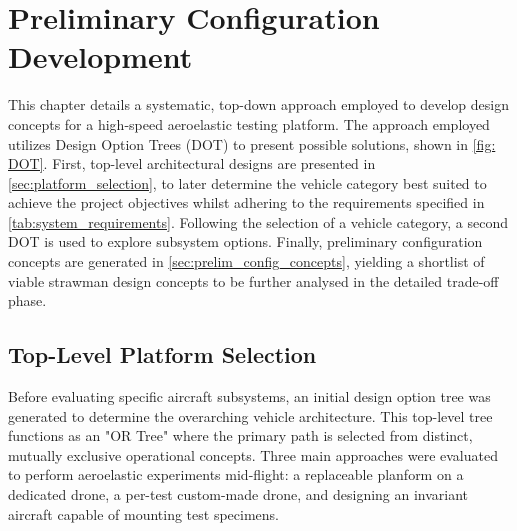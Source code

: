 \chapter{Preliminary Configuration Development}

This chapter details a systematic, top-down approach employed to develop design concepts for a high-speed aeroelastic testing platform. The approach employed utilizes Design Option Trees (DOT) to present possible solutions, shown in \autoref{fig: DOT}. First, top-level architectural designs are presented in \autoref{sec:platform_selection}, to later determine the vehicle category best suited to achieve the project objectives whilst adhering to the requirements specified in \autoref{tab:system_requirements}. Following the selection of a vehicle category, a second DOT is used to explore subsystem options. Finally, preliminary configuration concepts are generated in \autoref{sec:prelim_config_concepts}, yielding a shortlist of viable strawman design concepts to be further analysed in the detailed trade-off phase.

\section{Top-Level Platform Selection}
\label{sec:platform_selection}
Before evaluating specific aircraft subsystems, an initial design option tree was generated to determine the overarching vehicle architecture. This top-level tree functions as an "OR Tree" where the primary path is selected from distinct, mutually exclusive operational concepts. Three main approaches were evaluated to perform aeroelastic experiments mid-flight: a replaceable planform on a dedicated drone, a per-test custom-made drone, and designing an invariant aircraft capable of mounting test specimens. 

